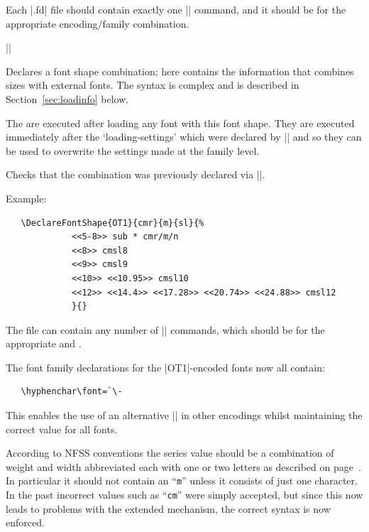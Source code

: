\documentclass{ltxguide}[1995/11/28]
\begin{document}
Each |.fd| file should contain exactly one |\DeclareFontFamily| command,
and it should be for the appropriate encoding/family combination.

\begin{decl}
|\DeclareFontShape|   
                    \\
        \null\hfill {} 
\end{decl}

Declares a font shape combination; here  contains the
information that combines sizes with external fonts. The syntax is
complex and is described in Section~\ref{sec:loadinfo} below.

The  are executed after loading any font with this
font shape.  They are executed immediately after the `loading-settings'
which were declared by |\DeclareFontFamily| and so they can be used to
overwrite the settings made at the family level.

Checks that the combination  was previously
declared via |\DeclareFontFamily|.

Example:
\begin{verbatim}
   \DeclareFontShape{OT1}{cmr}{m}{sl}{%
             <<5-8>> sub * cmr/m/n
             <<8>> cmsl8
             <<9>> cmsl9
             <<10>> <<10.95>> cmsl10
             <<12>> <<14.4>> <<17.28>> <<20.74>> <<24.88>> cmsl12
             }{}
\end{verbatim}
The file can contain any number of |\DeclareFontShape| commands, which
should be for the appropriate  and .

The font family declarations for the |OT1|-encoded fonts now all
contain:
\begin{verbatim}
   \hyphenchar\font=`\-
\end{verbatim}
This enables the use of an alternative |\hyphenchar| in other encodings
whilst maintaining the correct value for all fonts.

 According to NFSS conventions the series value
should be a combination of weight and width abbreviated each with one or
two letters as described on page~\pageref{page:seriesvalues}. In
particular it should not contain an ``\texttt{m}'' unless it
consists of just one character. In the past incorrect values such as
``\texttt{cm}'' were simply accepted, but since this now leads to
problems with the extended mechanism, the correct syntax is now
enforced.
\end{document}
